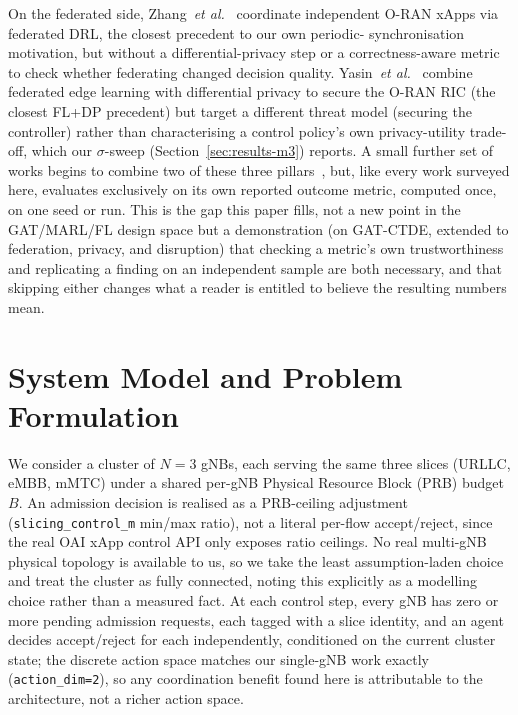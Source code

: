 \documentclass[pdflatex,sn-basic,Numbered]{sn-jnl}%
\begin{document}
On the federated side, Zhang~\emph{et
al.}~\cite{zhang2022federatedoran} coordinate independent O-RAN xApps
via federated DRL, the closest precedent to our own periodic-
synchronisation motivation, but without a differential-privacy step or
a correctness-aware metric to check whether federating changed
decision quality. Yasin~\emph{et al.}~\cite{yasin2025dpfl} combine federated edge learning with differential privacy to secure the O-RAN RIC (the closest FL+DP precedent) but target a different threat model (securing the controller) rather than characterising a control policy's own privacy-utility trade-off, which our $\sigma$-sweep (Section~\ref{sec:results-m3}) reports. A small further set of works
begins to combine two of these three
pillars~\cite{mohajer2026pronto,bouroudi2025gnnmarl,qasim2025tgnnfl,gong2026femaddpg},
but, like every work surveyed here, evaluates exclusively on its own
reported outcome metric, computed once, on one seed or run. This is the gap this paper fills, not a new point in the GAT/MARL/FL design space but a demonstration (on GAT-CTDE, extended to federation, privacy, and disruption) that checking a metric's own trustworthiness and replicating a finding on an independent sample are both necessary, and that skipping either changes what a reader is entitled to believe the resulting numbers mean.

\section{System Model and Problem Formulation}
\label{sec:system-model}
We consider a cluster of $N{=}3$ gNBs, each serving the same three
slices (URLLC, eMBB, mMTC) under a shared per-gNB Physical Resource
Block (PRB) budget $B$. An admission decision is realised as a
PRB-ceiling adjustment (\texttt{slicing\_control\_m} min/max ratio),
not a literal per-flow accept/reject, since the real OAI xApp control
API only exposes ratio ceilings. No real multi-gNB physical topology is
available to us, so we take the least assumption-laden choice and
treat the cluster as fully connected, noting this explicitly as a
modelling choice rather than a measured fact. At each control step,
every gNB has zero or more pending admission requests, each tagged
with a slice identity, and an agent decides accept/reject for each
independently, conditioned on the current cluster state; the discrete
action space matches our single-gNB work exactly
(\texttt{action\_dim=2}), so any coordination benefit found here is
attributable to the architecture, not a richer action space.
\end{document}
